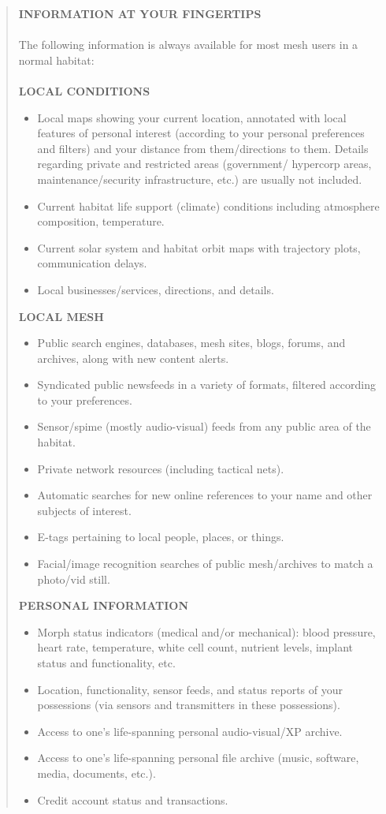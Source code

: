 \begin{quotation}
\textbf{INFORMATION AT YOUR FINGERTIPS}
\\
\\
The following information is always available for most mesh users in a normal habitat:
\\
\\
\noindent \textbf{LOCAL CONDITIONS}
\begin{itemize}
\item Local maps showing your current location, annotated with local features of personal interest (according to your personal preferences and filters) and your distance from them/directions to them. Details regarding private and restricted areas (government/ hypercorp areas, maintenance/security infrastructure, etc.) are usually not included.
\item Current habitat life support (climate) conditions including atmosphere composition, temperature.
\item Current solar system and habitat orbit maps with trajectory plots, communication delays.
\item Local businesses/services, directions, and details.
\end{itemize}

\noindent \textbf{LOCAL MESH}
\begin{itemize}
\item Public search engines, databases, mesh sites, blogs, forums, and archives, along with new content alerts.
\item Syndicated public newsfeeds in a variety of formats, filtered according to your preferences.
\item Sensor/spime (mostly audio-visual) feeds from any public area of the habitat.
\item Private network resources (including tactical nets).
\item Automatic searches for new online references to your name and other subjects of interest.
\item E-tags pertaining to local people, places, or things.
\item Facial/image recognition searches of public mesh/archives to match a photo/vid still.
\end{itemize}

\noindent \textbf{PERSONAL INFORMATION}
\begin{itemize}
\item Morph status indicators (medical and/or mechanical): blood pressure, heart rate, temperature, white cell count, nutrient levels, implant status and functionality, etc.
\item Location, functionality, sensor feeds, and status reports of your possessions (via sensors and transmitters in these possessions).
\item Access to one’s life-spanning personal audio-visual/XP archive.
\item Access to one’s life-spanning personal file archive (music, software, media, documents, etc.).
\item Credit account status and transactions.
\end{itemize}


\end{quotation}
